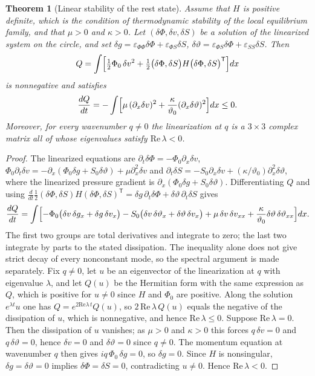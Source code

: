 \documentclass[11pt,oneside]{book}
\newtheorem{theorem}{Theorem}[chapter]
\theoremstyle{definition}
\theoremstyle{remark}
\begin{document}
\begin{theorem}[Linear stability of the rest state]\label{thm:linstab}
Assume that $H$ is positive definite, which is the condition of thermodynamic stability of the local equilibrium family, and that $\mu>0$ and $\kappa>0$. Let $(\delta\Phi,\delta v,\delta S)$ be a solution of the linearized system on the circle, and set $\delta g=\varepsilon_{\Phi\Phi}\delta\Phi+\varepsilon_{\Phi S}\delta S$, $\delta\vartheta=\varepsilon_{\Phi S}\delta\Phi+\varepsilon_{SS}\delta S$. Then
\[
Q=\int\Bigl[\tfrac12\Phi_0\,\delta v^2+\tfrac12\bigl(\delta\Phi,\delta S\bigr)H\bigl(\delta\Phi,\delta S\bigr)^{\mathsf T}\Bigr]dx
\]
is nonnegative and satisfies
\[
\frac{dQ}{dt}=-\int\Bigl[\mu\,(\partial_x\delta v)^2+\frac{\kappa}{\vartheta_0}(\partial_x\delta\vartheta)^2\Bigr]dx\leq0 .
\]
Moreover, for every wavenumber $q\neq0$ the linearization at $q$ is a $3\times3$ complex matrix all of whose eigenvalues satisfy $\mathrm{Re}\,\lambda<0$.
\end{theorem}

\begin{proof}
The linearized equations are $\partial_t\delta\Phi=-\Phi_0\partial_x\delta v$, $\Phi_0\partial_t\delta v=-\partial_x(\Phi_0\delta g+S_0\delta\vartheta)+\mu\partial_x^2\delta v$ and $\partial_t\delta S=-S_0\partial_x\delta v+(\kappa/\vartheta_0)\partial_x^2\delta\vartheta$, where the linearized pressure gradient is $\partial_x(\Phi_0\delta g+S_0\delta\vartheta)$. Differentiating $Q$ and using $\tfrac{d}{dt}\tfrac12(\delta\Phi,\delta S)H(\delta\Phi,\delta S)^{\mathsf T}=\delta g\,\partial_t\delta\Phi+\delta\vartheta\,\partial_t\delta S$ gives
\[
\frac{dQ}{dt}=\int\Bigl[-\Phi_0\bigl(\delta v\,\delta g_x+\delta g\,\delta v_x\bigr)-S_0\bigl(\delta v\,\delta\vartheta_x+\delta\vartheta\,\delta v_x\bigr)+\mu\,\delta v\,\delta v_{xx}+\frac\kappa{\vartheta_0}\delta\vartheta\,\delta\vartheta_{xx}\Bigr]dx .
\]
The first two groups are total derivatives and integrate to zero; the last two integrate by parts to the stated dissipation. The inequality alone does not give strict decay of every nonconstant mode, so the spectral argument is made separately. Fix $q\neq0$, let $u$ be an eigenvector of the linearization at $q$ with eigenvalue $\lambda$, and let $Q(u)$ be the Hermitian form with the same expression as $Q$, which is positive for $u\neq0$ since $H$ and $\Phi_0$ are positive. Along the solution $e^{\lambda t}u$ one has $Q=e^{2\mathrm{Re}\lambda\,t}Q(u)$, so $2\,\mathrm{Re}\,\lambda\,Q(u)$ equals the negative of the dissipation of $u$, which is nonnegative, and hence $\mathrm{Re}\,\lambda\leq0$. Suppose $\mathrm{Re}\,\lambda=0$. Then the dissipation of $u$ vanishes; as $\mu>0$ and $\kappa>0$ this forces $q\,\delta v=0$ and $q\,\delta\vartheta=0$, hence $\delta v=0$ and $\delta\vartheta=0$ since $q\neq0$. The momentum equation at wavenumber $q$ then gives $iq\,\Phi_0\,\delta g=0$, so $\delta g=0$. Since $H$ is nonsingular, $\delta g=\delta\vartheta=0$ implies $\delta\Phi=\delta S=0$, contradicting $u\neq0$. Hence $\mathrm{Re}\,\lambda<0$.
\end{proof}
\end{document}
